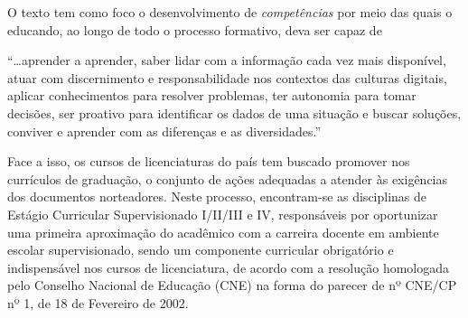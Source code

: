 O texto tem como foco o desenvolvimento de \emph{competências} por meio das quais o educando, ao longo de todo o processo formativo, deva ser capaz de
\begin{citacao}
    ``\ldots aprender a aprender, saber lidar com a informação cada vez mais disponível, atuar com discernimento e responsabilidade nos contextos das culturas digitais, aplicar conhecimentos para resolver problemas, ter autonomia para tomar decisões, ser proativo para identificar os dados de uma situação e buscar soluções, conviver e aprender com as diferenças e as diversidades.'' 
\end{citacao}

Face a isso, os cursos de licenciaturas do país tem buscado promover nos currículos de graduação, o conjunto de ações adequadas a atender às exigências dos documentos norteadores. Neste processo, encontram-se as disciplinas de Estágio Curricular Supervisionado I/II/III e IV, responsáveis por oportunizar uma primeira aproximação do acadêmico com a carreira docente em ambiente escolar supervisionado, sendo um componente curricular obrigatório e indispensável nos cursos de licenciatura, de acordo com a resolução \cite{BRASIL:2002a} homologada pelo Conselho Nacional de Educação (CNE) na forma do parecer de nº  CNE/CP nº 1, de 18 de Fevereiro de 2002.

